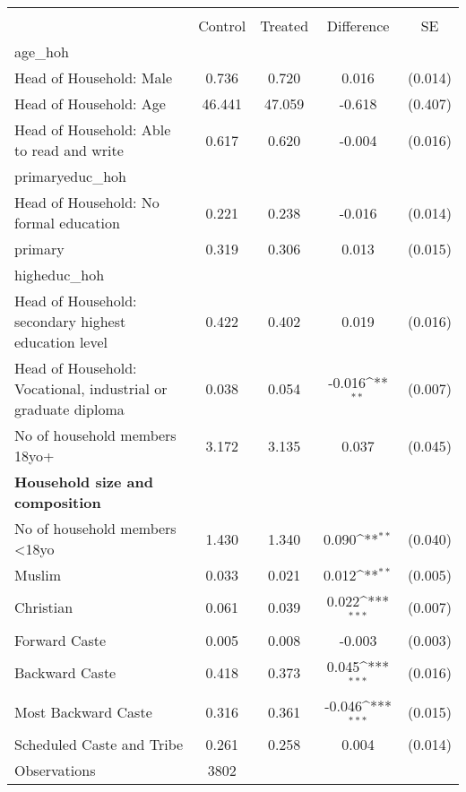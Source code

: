{
\def\sym#1{\ifmmode^{#1}\else\(^{#1}\)\fi}
\begin{tabular}{l*{1}{cccc}}
\hline\hline
                    &\multicolumn{4}{c}{}                                        \\
                    &     Control&     Treated&  Difference         &          SE\\
\hline
age\_hoh             &            &            &                     &            \\
Head of Household: Male&       0.736&       0.720&       0.016         &     (0.014)\\
Head of Household: Age&      46.441&      47.059&      -0.618         &     (0.407)\\
Head of Household: Able to read and write&       0.617&       0.620&      -0.004         &     (0.016)\\
primaryeduc\_hoh     &            &            &                     &            \\
Head of Household: No formal education&       0.221&       0.238&      -0.016         &     (0.014)\\
primary             &       0.319&       0.306&       0.013         &     (0.015)\\
higheduc\_hoh        &            &            &                     &            \\
Head of Household: secondary highest education level&       0.422&       0.402&       0.019         &     (0.016)\\
Head of Household: Vocational, industrial or graduate diploma&       0.038&       0.054&      -0.016\sym{**} &     (0.007)\\
No of household members 18yo+&       3.172&       3.135&       0.037         &     (0.045)\\
\textbf{Household size and composition}&            &            &                     &            \\
No of household members <18yo&       1.430&       1.340&       0.090\sym{**} &     (0.040)\\
Muslim              &       0.033&       0.021&       0.012\sym{**} &     (0.005)\\
Christian           &       0.061&       0.039&       0.022\sym{***}&     (0.007)\\
Forward Caste       &       0.005&       0.008&      -0.003         &     (0.003)\\
Backward Caste      &       0.418&       0.373&       0.045\sym{***}&     (0.016)\\
Most Backward Caste &       0.316&       0.361&      -0.046\sym{***}&     (0.015)\\
Scheduled Caste and Tribe&       0.261&       0.258&       0.004         &     (0.014)\\
\hline
Observations        &        3802&            &                     &            \\
\hline\hline
\end{tabular}
}
